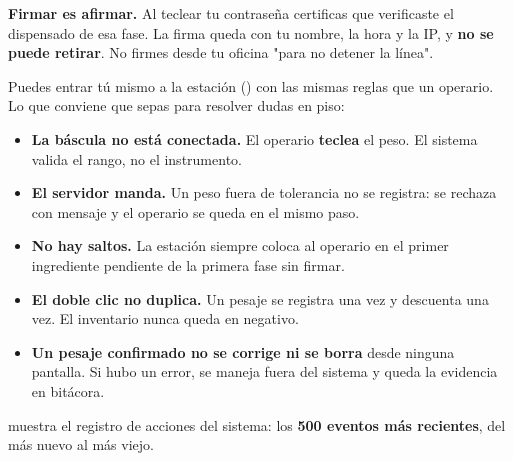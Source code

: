 \begin{cajaOjo}
\textbf{Firmar es afirmar.} Al teclear tu contraseña certificas que verificaste el
dispensado de esa fase. La firma queda con tu nombre, la hora y la IP, y
\textbf{no se puede retirar}. No firmes desde tu oficina "para no detener la línea".
\end{cajaOjo}

\newpage
{}

Puedes entrar tú mismo a la estación () con las mismas reglas que un
operario. Lo que conviene que sepas para resolver dudas en piso:

\begin{itemize}
    \item \textbf{La báscula no está conectada.} El operario \textbf{teclea} el peso.
          El sistema valida el rango, no el instrumento.
    \item \textbf{El servidor manda.} Un peso fuera de tolerancia no se registra:
          se rechaza con mensaje y el operario se queda en el mismo paso.
    \item \textbf{No hay saltos.} La estación siempre coloca al operario en el primer
          ingrediente pendiente de la primera fase sin firmar.
    \item \textbf{El doble clic no duplica.} Un pesaje se registra una vez y descuenta
          una vez. El inventario nunca queda en negativo.
    \item \textbf{Un pesaje confirmado no se corrige ni se borra} desde ninguna pantalla.
          Si hubo un error, se maneja fuera del sistema y queda la evidencia en bitácora.
\end{itemize}



\newpage
{}

 muestra el registro de acciones del sistema: los \textbf{500 eventos
más recientes}, del más nuevo al más viejo.



